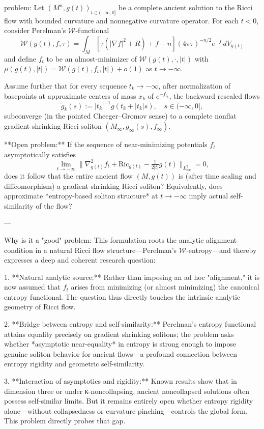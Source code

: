 problem:  
Let \((M^n, g(t))_{t \in (-\infty, 0]}\) be a complete ancient solution to the Ricci flow with bounded curvature and nonnegative curvature operator.  
For each \(t<0\), consider Perelman's \(\mathcal{W}\)-functional
\[
\mathcal{W}(g(t), f, \tau) = \int_M \left[\tau(|\nabla f|^2 + R) + f - n\right]
(4\pi\tau)^{-n/2} e^{-f}\, dV_{g(t)}
\]
and define \(f_t\) to be an almost-minimizer of \(\mathcal{W}(g(t),\cdot,|t|)\) with \(\mu(g(t),|t|) = \mathcal{W}(g(t),f_t,|t|) + o(1)\) as \(t\to -\infty\).

Assume further that for every sequence \(t_k \to -\infty\), after normalization of basepoints at approximate centers of mass \(x_k\) of \(e^{-f_{t_k}}\), the backward rescaled flows
\[
\tilde g_k(s) := |t_k|^{-1} g(t_k + |t_k| s), \quad s \in (-\infty, 0],
\]
subconverge (in the pointed Cheeger–Gromov sense) to a complete nonflat gradient shrinking Ricci soliton \((M_\infty,g_\infty(s),f_\infty)\).

**Open problem:**  
If the sequence of near-minimizing potentials \(f_t\) asymptotically satisfies
\[
\lim_{t\to-\infty}
\| \nabla^2_{g(t)} f_t + \mathrm{Ric}_{g(t)} - \tfrac{1}{2|t|}g(t)\|_{L^2_{\mathrm{loc}}} = 0,
\]
does it follow that the entire ancient flow \((M,g(t))\) is (after time scaling and diffeomorphism) a gradient shrinking Ricci soliton?  
Equivalently, does approximate *entropy-based soliton structure* at \(t\to-\infty\) imply actual self-similarity of the flow?

---

Why is it a "good" problem:  
This formulation roots the analytic alignment condition in a natural Ricci flow structure—Perelman’s \(\mathcal{W}\)-entropy—and thereby expresses a deep and coherent research question:

1. **Natural analytic source:**  
   Rather than imposing an ad hoc "alignment," it is now assumed that \(f_t\) arises from minimizing (or almost minimizing) the canonical entropy functional. The question thus directly touches the intrinsic analytic geometry of Ricci flow.

2. **Bridge between entropy and self-similarity:**  
   Perelman’s entropy functional attains equality precisely on gradient shrinking solitons; the problem asks whether *asymptotic near-equality* in entropy is strong enough to impose genuine soliton behavior for ancient flows—a profound connection between entropy rigidity and geometric self-similarity.

3. **Interaction of asymptotics and rigidity:**  
   Known results show that in dimension three or under κ-noncollapsing, ancient noncollapsed solutions often possess self-similar limits. But it remains entirely open whether entropy rigidity alone—without collapsedness or curvature pinching—controls the global form. This problem directly probes that gap.

